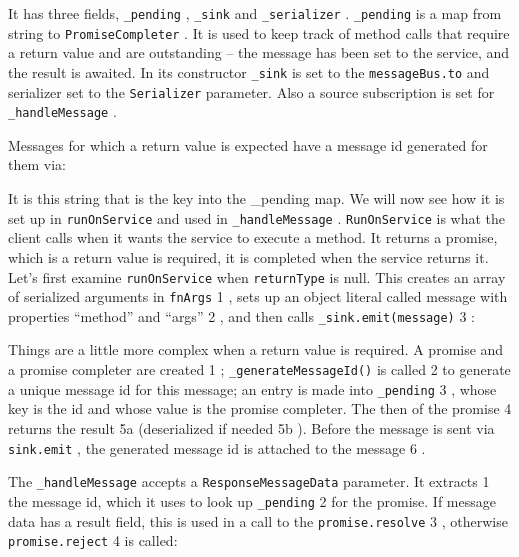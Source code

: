 

It has three fields,
\texttt{\_pending}
,
\texttt{\_sink}
and
\texttt{\_serializer}
.
\texttt{\_pending}
is a map from string
to
\texttt{PromiseCompleter}
. It is used to keep track of method calls that require a return
value and are outstanding – the message has been set to the service, and the result is
awaited. In its constructor
\texttt{\_sink}
is set to the
\texttt{messageBus.to}
and serializer set to the
\texttt{Serializer}
parameter. Also a source subscription is set for
\texttt{\_handleMessage}
.

Messages for which a return value is expected have a message id generated for them
via:



It is this string that is the key into the \_pending map. We will now see how it is set up
in
\texttt{runOnService}
and used in
\texttt{\_handleMessage}
.
\texttt{RunOnService}
is what the client calls
when it wants the service to execute a method. It returns a promise, which is a return
value is required, it is completed when the service returns it.
Let’s first examine
\texttt{runOnService}
when
\texttt{returnType}
is null. This creates an array of
serialized arguments in
\texttt{fnArgs}
1
, sets up an object literal called message with
properties “method” and “args”
2
, and then calls
\texttt{\_sink.emit(message)}
3
:



Things are a little more complex when a return value is required. A promise and a
promise completer are created
1
;
\texttt{\_generateMessageId()}
is called
2
to generate a
unique message id for this message; an entry is made into
\texttt{\_pending}
3
, whose key is
the id and whose value is the promise completer. The then of the promise
4
returns
the result
5a
(deserialized if needed
5b
). Before the message is sent via
\texttt{sink.emit}
,
the generated message id is attached to the message
6
.



The
\texttt{\_handleMessage}
accepts a
\texttt{ResponseMessageData}
parameter. It extracts
1
the
message id, which it uses to look up
\texttt{\_pending}
2
for the promise. If message data has
a result field, this is used in a call to the
\texttt{promise.resolve}
3
, otherwise
\texttt{promise.reject}
4
is called:

